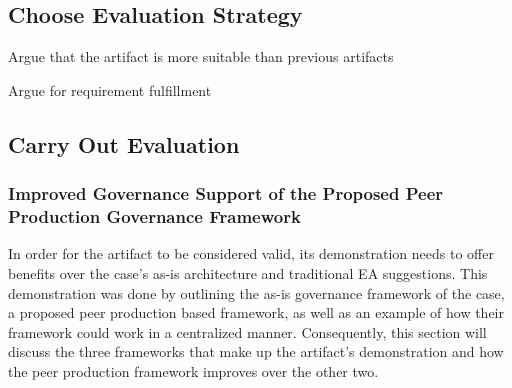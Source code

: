 


\subsection{Choose Evaluation Strategy}

Argue that the artifact is more suitable than previous artifacts

Argue for requirement fulfillment

\subsection{Carry Out Evaluation}

\subsubsection*{Improved Governance Support of the Proposed Peer Production Governance Framework}


In order for the artifact to be considered valid, its demonstration needs to offer benefits over the case's as-is architecture and traditional EA suggestions. This demonstration was done by outlining the as-is governance framework of the case, a proposed peer production based framework, as well as an example of how their framework could work in a centralized manner. Consequently, this section will discuss the three frameworks that make up the artifact's demonstration and how the peer production framework improves over the other two. 


